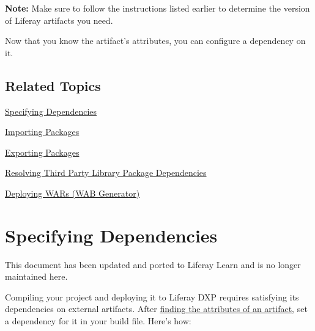 \noindent\hrulefill

\textbf{Note:} Make sure to follow the instructions listed earlier to
determine the version of Liferay artifacts you need.

\noindent\hrulefill

Now that you know the artifact's attributes, you can configure a
dependency on it.

\section{Related Topics}\label{related-topics}

\href{/docs/7-2/customization/-/knowledge_base/c/specifying-dependencies}{Specifying
Dependencies}

\href{/docs/7-2/customization/-/knowledge_base/c/importing-packages}{Importing
Packages}

\href{/docs/7-2/customization/-/knowledge_base/c/exporting-packages}{Exporting
Packages}

\href{/docs/7-2/customization/-/knowledge_base/c/adding-third-party-libraries-to-a-module}{Resolving
Third Party Library Package Dependencies}

\href{/docs/7-2/customization/-/knowledge_base/c/deploying-wars-wab-generator}{Deploying
WARs (WAB Generator)}

\chapter{Specifying Dependencies}\label{specifying-dependencies}

{ This document has been updated and ported to Liferay Learn and is no
longer maintained here.}

Compiling your project and deploying it to Liferay DXP requires
satisfying its dependencies on external artifacts. After
\href{/docs/7-2/customization/-/knowledge_base/c/finding-artifacts}{finding
the attributes of an artifact}, set a dependency for it in your build
file. Here's how:

